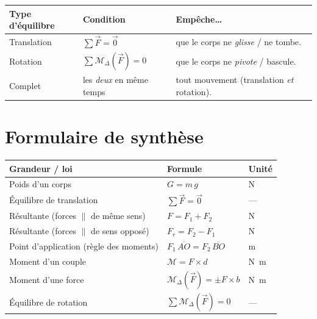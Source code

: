 \documentclass[11pt,a4paper]{article}
\newcommand{\vv}[1]{\vec{#1}}
\newcommand{\Mom}{\mathcal{M}}      %
\begin{document}
\begin{center}
\renewcommand{\arraystretch}{1.4}
\begin{tabular}{p{4.0cm} >{\centering\arraybackslash}p{4.3cm} p{5.0cm}}
\rowcolor{primary!15}
\textbf{Type d'équilibre} & \textbf{Condition} & \textbf{Empêche\dots} \\
\hline
\rowcolor{primary!4}
Translation & $\displaystyle\sum \vv F = \vv 0$ & que le corps ne \emph{glisse} / ne tombe. \\
Rotation & $\displaystyle\sum \Mom_{\Delta}(\vv F) = 0$ & que le corps ne \emph{pivote} / bascule. \\
\rowcolor{primary!4}
Complet & les \emph{deux} en même temps & tout mouvement (translation \emph{et} rotation). \\
\end{tabular}
\end{center}

\section{Formulaire de synthèse}
\begin{center}
\renewcommand{\arraystretch}{1.5}
\begin{tabular}{p{5.6cm} p{5.0cm} p{3.0cm}}
\rowcolor{primary!15}
\textbf{Grandeur / loi} & \textbf{Formule} & \textbf{Unité} \\
\hline
Poids d'un corps & $G = m\,g$ & \si{\newton} \\
\rowcolor{primary!4}
Équilibre de translation & $\sum \vv F = \vv 0$ & — \\
Résultante (forces $\parallel$ de même sens) & $F = F_1 + F_2$ & \si{\newton} \\
\rowcolor{primary!4}
Résultante (forces $\parallel$ de sens opposé) & $F_r = F_2 - F_1$ & \si{\newton} \\
Point d'application (règle des moments) & $F_1\,\overline{AO} = F_2\,\overline{BO}$ & \si{\metre} \\
\rowcolor{primary!4}
Moment d'un couple & $\Mom = F\times d$ & \si{\newton\metre} \\
Moment d'une force & $\Mom_{\Delta}(\vv F) = \pm F\times b$ & \si{\newton\metre} \\
\rowcolor{primary!4}
Équilibre de rotation & $\sum \Mom_{\Delta}(\vv F) = 0$ & — \\
\end{tabular}
\end{center}
\end{document}
